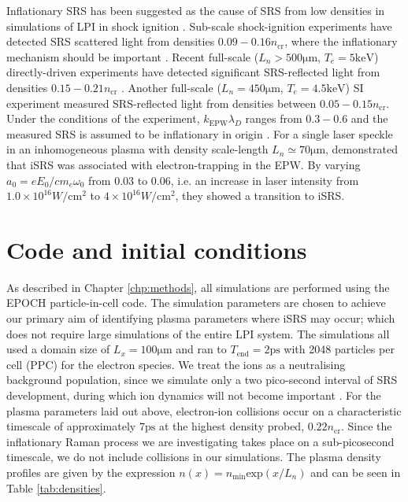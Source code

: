  Inflationary SRS has been suggested as the cause of SRS from low densities
 in simulations of LPI in shock ignition \citep{Klimo2014}. Sub-scale shock-ignition experiments have detected
 SRS scattered light from densities $0.09 - 0.16 n_\mathrm{cr}$, where the inflationary mechanism should be important \citep{Cristoforetti2017}. Recent full-scale ($L_n > 500
 \si{\micro\metre}$, $T_e = 5\si{\kilo \electronvolt}$) directly-driven experiments have detected significant SRS-reflected light from densities $0.15 - 0.21 n_{\mathrm{cr}}$ \citep{Rosenberg2020}. Another full-scale ($L_n = 450
 \si{\micro\metre}$, $T_e = 4.5\si{\kilo \electronvolt}$) SI experiment measured SRS-reflected light from densities between $0.05 - 0.15 n_{\mathrm{cr}}$. Under the conditions of the experiment, $k_{\mathrm{EPW}}\lambda_D$ ranges from $0.3 - 0.6$ and the measured SRS is assumed to be inflationary in origin \citep{Baton2020}.
 For a single laser speckle in an inhomogeneous plasma with density
 scale-length $L_n\simeq 70 \si{\micro\metre}$, \citet{Riconda2011} demonstrated
 that iSRS  was associated
 with electron-trapping in the EPW. By varying $a_0=eE_0/c m_e \omega_0$ from 0.03 to 0.06, i.e. an increase in
 laser intensity from $1.0\times10^{16} \si{W/\centi\metre^2}$ to $4\times10^{16} \si{W/\centi\metre^2}$, they showed
 a transition to iSRS.

\section{Code and initial conditions}\label{sec:code&IC}


As described in Chapter \ref{chp:methods}, all simulations are performed using the EPOCH \citep{Arber2015} particle-in-cell code. The simulation parameters are chosen to achieve our primary aim of identifying plasma parameters where iSRS may occur; which does not require large simulations of the entire LPI system. The simulations all used a domain size of $L_x = 100\si{\micro\metre} $ and ran to $T_\mathrm{end} = 2\si{\pico\second}$
with 2048
particles per cell (PPC) for the electron species.
We treat the ions as a neutralising background population, since we simulate only a two pico-second interval of SRS
development, during which ion dynamics will not become important \citep{Rousseaux2006}.
For the plasma parameters laid out above, electron-ion collisions occur on a characteristic timescale of approximately
$7 \si{\pico\second}$ at the highest density probed, $0.22n_\mathrm{cr}$. Since the inflationary Raman process we
are investigating takes place
on a sub-picosecond timescale, we do not include collisions in our simulations.
The plasma density profiles are given by the expression $n(x) = n_\mathrm{min}\mathrm{exp}(x/L_n)$ and can be seen in Table
\ref{tab:densities}.

